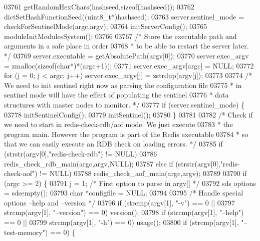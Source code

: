 \begin{DoxyCode}
{{{{{{{{{{{{{{{{{{{{{{{{{{{{{{{{{{{{{{{{{{{{{{{{{{{{{{{{{{{{{{{{{{{{{{{{{{{{{{{{{{{{{{{{{{{{{{{{{{{{{{{{{{{{{{{{{{{{{{{{{{{{{{{{{{{{{{{{{{{{{{{{{{{{{{{{{{{{{{{{{{{{{{{{{{{{{{{{{{03761     getRandomHexChars(hashseed,\textcolor{keyword}{sizeof}(hashseed));
03762     dictSetHashFunctionSeed((uint8\_t*)hashseed);
03763     server.sentinel\_mode = checkForSentinelMode(argc,argv);
03764     initServerConfig();
03765     moduleInitModulesSystem();
03766 
03767     \textcolor{comment}{/* Store the executable path and arguments in a safe place in order}
03768 \textcolor{comment}{     * to be able to restart the server later. */}
03769     server.executable = getAbsolutePath(argv[0]);
03770     server.exec\_argv = zmalloc(\textcolor{keyword}{sizeof}(\textcolor{keywordtype}{char}*)*(argc+1));
03771     server.exec\_argv[argc] = NULL;
03772     \textcolor{keywordflow}{for} (j = 0; j < argc; j++) server.exec\_argv[j] = zstrdup(argv[j]);
03773 
03774     \textcolor{comment}{/* We need to init sentinel right now as parsing the configuration file}
03775 \textcolor{comment}{     * in sentinel mode will have the effect of populating the sentinel}
03776 \textcolor{comment}{     * data structures with master nodes to monitor. */}
03777     \textcolor{keywordflow}{if} (server.sentinel\_mode) \{
03778         initSentinelConfig();
03779         initSentinel();
03780     \}
03781 
03782     \textcolor{comment}{/* Check if we need to start in redis-check-rdb/aof mode. We just execute}
03783 \textcolor{comment}{     * the program main. However the program is part of the Redis executable}
03784 \textcolor{comment}{     * so that we can easily execute an RDB check on loading errors. */}
03785     \textcolor{keywordflow}{if} (strstr(argv[0],\textcolor{stringliteral}{"redis-check-rdb"}) != NULL)
03786         redis\_check\_rdb\_main(argc,argv,NULL);
03787     \textcolor{keywordflow}{else} \textcolor{keywordflow}{if} (strstr(argv[0],\textcolor{stringliteral}{"redis-check-aof"}) != NULL)
03788         redis\_check\_aof\_main(argc,argv);
03789 
03790     \textcolor{keywordflow}{if} (argc >= 2) \{
03791         j = 1; \textcolor{comment}{/* First option to parse in argv[] */}
03792         sds options = sdsempty();
03793         \textcolor{keywordtype}{char} *configfile = NULL;
03794 
03795         \textcolor{comment}{/* Handle special options --help and --version */}
03796         \textcolor{keywordflow}{if} (strcmp(argv[1], \textcolor{stringliteral}{"-v"}) == 0 ||
03797             strcmp(argv[1], \textcolor{stringliteral}{"--version"}) == 0) version();
03798         \textcolor{keywordflow}{if} (strcmp(argv[1], \textcolor{stringliteral}{"--help"}) == 0 ||
03799             strcmp(argv[1], \textcolor{stringliteral}{"-h"}) == 0) usage();
03800         \textcolor{keywordflow}{if} (strcmp(argv[1], \textcolor{stringliteral}{"--test-memory"}) == 0) \{
}}}}}}}}}}}}}}}}}}}}}}}}}}}}}}}}}}}}}}}}}}}}}}}}}}}}}}}}}}}}}}}}}}}}}}}}}}}}}}}}}}}}}}}}}}}}}}}}}}}}}}}}}}}}}}}}}}}}}}}}}}}}}}}}}}}}}}}}}}}}}}}}}}}}}}}}}}}}}}}}}}}}}}}}}}}}}}}}}}
\end{DoxyCode}
